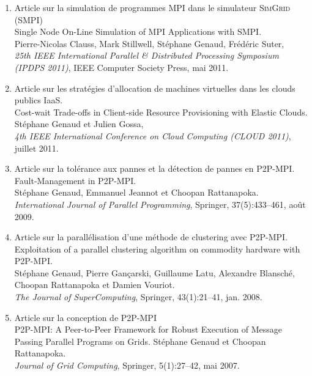 \documentclass[11pt]{article}
\begin{document}
\vspace{1cm}

\begin{enumerate}
\item Article sur la simulation de programmes MPI dans le simulateur \textsc{SimGrid} (SMPI)\\
Single Node On-Line Simulation of MPI Applications with SMPI.\\
Pierre-Nicolas Clauss, Mark Stillwell, Stéphane Genaud, Fr\'ed\'eric Suter,\\
{\em 25th IEEE International Parallel \& Distributed Processing Symposium (IPDPS 2011)}, 
IEEE Computer Society Press, mai 2011.\\

\item Article sur les stratégies d'allocation de machines virtuelles dans les clouds publics IaaS.\\
Cost-wait Trade-offs in Client-side Resource Provisioning with Elastic Clouds.\\
Stéphane Genaud et Julien Gossa,\\
{\em 4th IEEE International Conference on Cloud Computing (CLOUD 2011)}, juillet 2011.\\


\item Article sur la tolérance aux pannes et la détection de pannes en P2P-MPI.\\ 
Fault-Management in P2P-MPI.\\
Stéphane Genaud, Emmanuel Jeannot et Choopan Rattanapoka.\\
{\em International Journal of Parallel Programming}, Springer, 37(5):433--461, août 2009.\\


\item Article sur la parallélisation d'une méthode de clustering avec P2P-MPI.\\
Exploitation of a parallel clustering algorithm on commodity hardware with P2P-MPI.\\
Stéphane Genaud, Pierre Gançarski, Guillaume Latu, Alexandre Blansché, Choopan Rattanapoka et Damien Vouriot.\\
{\em The Journal of SuperComputing}, Springer, 43(1):21--41, jan. 2008.\\


\item Article sur la conception de P2P-MPI\\
P2P-MPI: A Peer-to-Peer Framework for Robust Execution of Message Passing Parallel Programs on Grids.
Stéphane Genaud et Choopan Rattanapoka.\\
{\em Journal of Grid Computing}, Springer, 5(1):27--42, mai 2007.\\



\end{enumerate}
\end{document}
